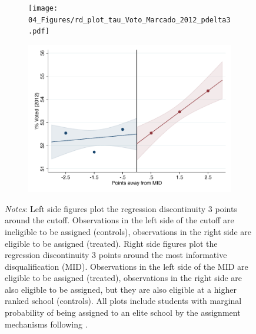 \documentclass[oneside,11pt]{article}
\begin{document}
\begin{figure}[H]
\begin{center}
    \begin{subfigure}{0.475\textwidth}
        \centering
        \texttt{[image: 04\_Figures/rd\_plot\_tau\_Voto\_Marcado\_2012\_pdelta3.pdf]}
    \end{subfigure}
    \begin{subfigure}{0.475\textwidth}
        \centering
        \includegraphics[width=\textwidth]{04_Figures/rd_plot_mid_Voto_Marcado_2012_pdelta3.pdf}
    \end{subfigure}
    \end{center}
    
\footnotesize
\textit{Notes}: Left side figures plot the regression discontinuity 3 points around the cutoff. Observations in the left side of the cutoff are ineligible to be assigned (controls), observations in the right side are eligible to be assigned (treated). Right side figures plot the regression discontinuity 3 points around the most informative disqualification (MID). Observations in the left side of the MID are eligible to be assigned (treated), observations in the right side are also eligible to be assigned, but they are also eligible at a higher ranked school (controls). All plots include students with marginal probability of being assigned to an elite school by the assignment mechanisms following \citet{abdulkadirouglu2022breaking}. 
\end{figure}
\end{document}
